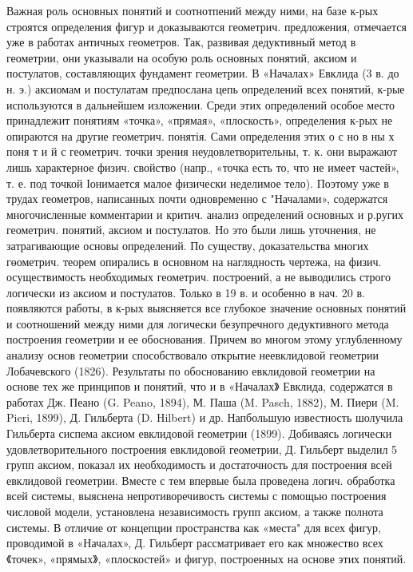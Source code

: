 \documentclass[10pt]{article}
\begin{document}
Важная роль основных понятий и соотнотпений между ними, на базе к-рых строятся определения фигур и доказываются геометрич. предложения, отмечается уже в работах античных геометров. Так, развивая дедуктивный метод в геометрии, они указывали на особую роль основных понятий, аксиом и постулатов, составляющих фундамент геометрии. В «Началах» Евклида (3 в. до н. э.) аксиомам и постулатам предпослана цепь определений всех понятий, к-рые используются в дальнейшем изложении. Среди этих опредөлений особое место принадлежит понятиям «точка», «прямая», «плоскость», определения к-рых не опираются на другие геометрич. понятія. Сами определения этих о с но в ны х поня т и й с геометрич. точки зрения неудовлетворительны, т. к. они выражают лишь характерное физич. свойство (напр., «точка есть то, что не имеет частей», т. е. под точкой Іонимается малое физически неделимое тело). Поэтому уже в трудах геометров, написанных почти одновременно с "Началами», содержатся многочисленные комментарии и критич. анализ определений основных и р.ругих геометрич. понятий, аксиом и постулатов. Но это были лишь уточнения, не затрагивающие основы определений. По существу, доказательства многих гөометрич. теорем опирались в основном на наглядность чертежа, на физич. осуществимость необходимых геометрич. построений, а не выводились строго логически из аксиом и постулатов. Только в 19 в. и особенно в нач. 20 в. появляются работы, в к-рых выясняется все глубокое значение основных понятий и соотношений между ними для логически безупречного дедуктивного метода построения геометрии и ее обоснования. Причем во многом этому углубленному анализу основ геометрии способствовало открытие неевклидовой геометрии Лобачевского (1826). Результаты по обоснованию евклидовой геометрии на основе тех же принципов и понятий, что и в «Началах》 Евклида, содержатся в работах Дж. Пеано (G. Peano, 1894), М. Паша (M. Pasch, 1882), М. Пиери (M. Pieri, 1899), Д. Гильберта (D. Hilbert) и др. Напбольшую известность шолучила Гильберта сиспема аксиом евклидовой геометрии (1899). Добиваясь логически удовлетворительного построения евклидовой геометрии, Д. Гильберт выделил 5 групп аксиом, показал их необходимость и достаточность для построения всей евклидовой геометрии. Вместе с тем впервые была проведена логич. обработка всей системы, выяснена непротиворечивость системы с помощью построения числовой модели, установлена независимость групп аксиом, а также полнота системы. В отличие от концепции пространства как «места" для всех фигур, проводимой в «Началах», Д. Гильберт рассматривает его как множество всех 《точек», «прямых》, «плоскостей» и фигур, построенных на основе этих понятий.
\end{document}
